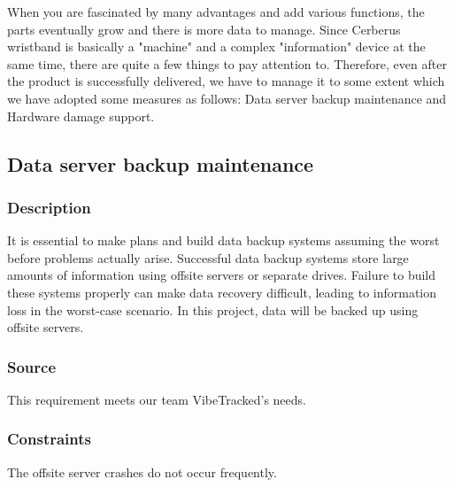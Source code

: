 When you are fascinated by many advantages and add various functions, the parts eventually grow and there is more data to manage. Since Cerberus wristband is basically a "machine" and a complex "information" device at the same time, there are quite a few things to pay attention to. Therefore, even after the product is successfully delivered, we have to manage it to some extent which we have adopted some measures as follows: Data server backup maintenance and Hardware damage support.

\subsection{Data server backup maintenance}
\subsubsection{Description}
It is essential to make plans and build data backup systems assuming the worst before problems actually arise. Successful data backup systems store large amounts of information using offsite servers or separate drives. Failure to build these systems properly can make data recovery difficult, leading to information loss in the worst-case scenario. In this project, data will be backed up using offsite servers.
\subsubsection{Source}
This requirement meets our team VibeTracked's needs.
\subsubsection{Constraints}
The offsite server crashes do not occur frequently. 
